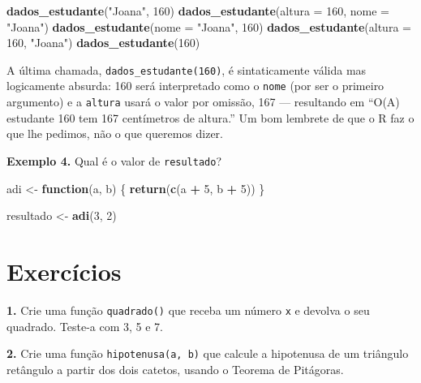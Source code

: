 \documentclass[
  portuguese,
  11pt,
  openany]{book}
\newenvironment{Shaded}{\begin{snugshade}}{\end{snugshade}}
\newcommand{\AttributeTok}[1]{\textcolor[rgb]{0.13,0.29,0.53}{#1}}
\newcommand{\ControlFlowTok}[1]{\textcolor[rgb]{0.13,0.29,0.53}{\textbf{#1}}}
\newcommand{\DecValTok}[1]{\textcolor[rgb]{0.00,0.00,0.81}{#1}}
\newcommand{\FunctionTok}[1]{\textcolor[rgb]{0.13,0.29,0.53}{\textbf{#1}}}
\newcommand{\NormalTok}[1]{#1}
\newcommand{\OtherTok}[1]{\textcolor[rgb]{0.56,0.35,0.01}{#1}}
\newcommand{\SpecialCharTok}[1]{\textcolor[rgb]{0.81,0.36,0.00}{\textbf{#1}}}
\newcommand{\StringTok}[1]{\textcolor[rgb]{0.31,0.60,0.02}{#1}}
\begin{document}
\begin{Shaded}
\begin{Highlighting}[]
\FunctionTok{dados\_estudante}\NormalTok{(}\StringTok{"Joana"}\NormalTok{, }\DecValTok{160}\NormalTok{)}
\FunctionTok{dados\_estudante}\NormalTok{(}\AttributeTok{altura =} \DecValTok{160}\NormalTok{, }\AttributeTok{nome =} \StringTok{"Joana"}\NormalTok{)}
\FunctionTok{dados\_estudante}\NormalTok{(}\AttributeTok{nome =} \StringTok{"Joana"}\NormalTok{, }\DecValTok{160}\NormalTok{)}
\FunctionTok{dados\_estudante}\NormalTok{(}\AttributeTok{altura =} \DecValTok{160}\NormalTok{, }\StringTok{"Joana"}\NormalTok{)}
\FunctionTok{dados\_estudante}\NormalTok{(}\DecValTok{160}\NormalTok{)}
\end{Highlighting}
\end{Shaded}

A última chamada, \texttt{dados\_estudante(160)}, é sintaticamente válida mas
logicamente absurda: 160 será interpretado como o \texttt{nome} (por ser o primeiro
argumento) e a \texttt{altura} usará o valor por omissão, 167 --- resultando em ``O(A)
estudante 160 tem 167 centímetros de altura.'' Um bom lembrete de que o R faz o que
lhe pedimos, não o que queremos dizer.

\textbf{Exemplo 4.} Qual é o valor de \texttt{resultado}?

\begin{Shaded}
\begin{Highlighting}[]
\NormalTok{adi }\OtherTok{\textless{}{-}} \ControlFlowTok{function}\NormalTok{(a, b) \{}
  \FunctionTok{return}\NormalTok{(}\FunctionTok{c}\NormalTok{(a }\SpecialCharTok{+} \DecValTok{5}\NormalTok{, b }\SpecialCharTok{+} \DecValTok{5}\NormalTok{))}
\NormalTok{\}}

\NormalTok{resultado }\OtherTok{\textless{}{-}} \FunctionTok{adi}\NormalTok{(}\DecValTok{3}\NormalTok{, }\DecValTok{2}\NormalTok{)}
\end{Highlighting}
\end{Shaded}

\section{Exercícios}\label{exercuxedcios-7}

\textbf{1.} Crie uma função \texttt{quadrado()} que receba um número \texttt{x} e devolva o seu
quadrado. Teste-a com 3, 5 e 7.

\textbf{2.} Crie uma função \texttt{hipotenusa(a,\ b)} que calcule a hipotenusa de um triângulo
retângulo a partir dos dois catetos, usando o Teorema de Pitágoras.
\end{document}
